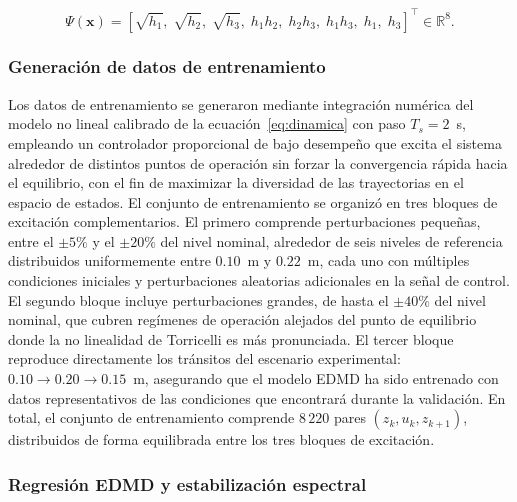 \documentclass[12pt,letterpaper]{article}
\begin{document}
\begin{equation}
\Psi(\mathbf{x}) = \left[ \sqrt{h_1},\; \sqrt{h_2},\; \sqrt{h_3},\; 
h_1 h_2,\; h_2 h_3,\; h_1 h_3,\; h_1,\; h_3 \right]^\top \in 
\mathbb{R}^8.
\label{eq:diccionario}
\end{equation}

\subsubsection{Generación de datos de entrenamiento}

Los datos de entrenamiento se generaron mediante integración numérica del 
modelo no lineal calibrado de la ecuación~\eqref{eq:dinamica} con paso 
$T_s = 2$~s, empleando un controlador proporcional de bajo desempeño que 
excita el sistema alrededor de distintos puntos de operación sin forzar 
la convergencia rápida hacia el equilibrio, con el fin de maximizar la 
diversidad de las trayectorias en el espacio de estados. El conjunto de 
entrenamiento se organizó en tres bloques de excitación complementarios. 
El primero comprende perturbaciones pequeñas, entre el $\pm 5\%$ y el 
$\pm 20\%$ del nivel nominal, alrededor de seis niveles de referencia 
distribuidos uniformemente entre $0.10$~m y $0.22$~m, cada uno con 
múltiples condiciones iniciales y perturbaciones aleatorias adicionales 
en la señal de control. El segundo bloque incluye perturbaciones grandes, 
de hasta el $\pm 40\%$ del nivel nominal, que cubren regímenes de 
operación alejados del punto de equilibrio donde la no linealidad de 
Torricelli es más pronunciada. El tercer bloque reproduce directamente 
los tránsitos del escenario experimental: $0.10 \rightarrow 0.20 
\rightarrow 0.15$~m, asegurando que el modelo EDMD ha sido entrenado con 
datos representativos de las condiciones que encontrará durante la 
validación. En total, el conjunto de entrenamiento comprende $8\,220$ 
pares $(z_k, u_k, z_{k+1})$, distribuidos de forma equilibrada entre los 
tres bloques de excitación.

\subsubsection{Regresión EDMD y estabilización espectral}
\end{document}
